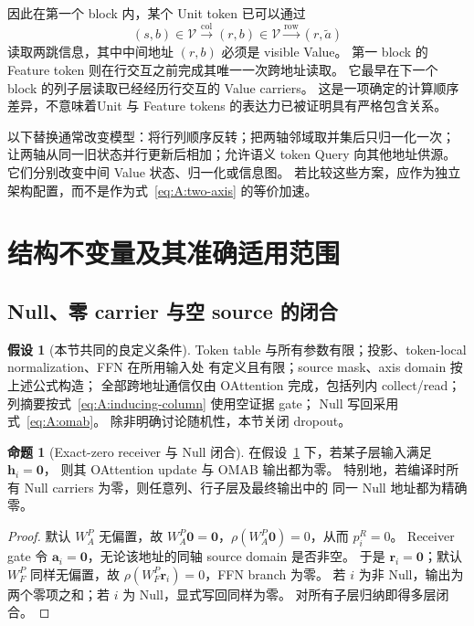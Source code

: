 \documentclass[11pt,UTF8,fontset=fandol]{ctexart}
\numberwithin{equation}{section}
\theoremstyle{definition}
\newtheorem{assumption}[definition]{假设}
\newtheorem{proposition}[definition]{命题}
\newcommand{\Vset}{\mathcal V}
\newcommand{\Ustar}{\widetilde a}
\begin{document}
因此在第一个 block 内，某个 Unit token 已可以通过
\begin{equation}
 (s,b)\in\Vset
 \xrightarrow{\mathrm{col}}
 (r,b)\in\Vset
 \xrightarrow{\mathrm{row}}
 (r,\Ustar)
 \label{eq:A:unit-two-hop}
\end{equation}
读取两跳信息，其中中间地址 $(r,b)$ 必须是 visible Value。
第一 block 的 Feature token 则在行交互之前完成其唯一一次跨地址读取。
它最早在下一个 block 的列子层读取已经经历行交互的 Value carriers。
这是一项确定的计算顺序差异，不意味着Unit 与 Feature tokens 的表达力已被证明具有严格包含关系。

以下替换通常改变模型：将行列顺序反转；把两轴邻域取并集后只归一化一次；
让两轴从同一旧状态并行更新后相加；允许语义 token Query 向其他地址供源。
它们分别改变中间 Value 状态、归一化或信息图。
若比较这些方案，应作为独立架构配置，而不是作为式~\eqref{eq:A:two-axis} 的等价加速。


\section{结构不变量及其准确适用范围}
\label{sec:A:invariants}

\subsection{Null、零 carrier 与空 source 的闭合}
\label{subsec:A:zero-closure}

\begin{assumption}[本节共同的良定义条件]
\label{ass:A:finite-local}
Token table 与所有参数有限；投影、token-local normalization、FFN 在所用输入处
有定义且有限；source mask、axis domain 按上述公式构造；
全部跨地址通信仅由 OAttention 完成，包括列内 collect/read；
列摘要按式~\eqref{eq:A:inducing-column} 使用空证据 gate；
Null 写回采用式~\eqref{eq:A:omab}。
除非明确讨论随机性，本节关闭 dropout。
\end{assumption}

\begin{proposition}[Exact-zero receiver 与 Null 闭合]
\label{prop:A:null-closure}
在假设~\ref{ass:A:finite-local} 下，若某子层输入满足 $\bm h_i=\bm0$，
则其 OAttention update 与 OMAB 输出都为零。
特别地，若编译时所有 Null carriers 为零，则任意列、行子层及最终输出中的
同一 Null 地址都为精确零。
\end{proposition}
\begin{proof}
默认 $W_A^{P}$ 无偏置，故 $W_A^{P}\bm0=\bm0$，$\rho(W_A^{P}\bm0)=0$，从而 $p_i^R=0$。
Receiver gate 令 $\bm a_i=\bm0$，无论该地址的同轴 source domain 是否非空。
于是 $\bm r_i=\bm0$；默认 $W_F^{P}$ 同样无偏置，故 $\rho(W_F^{P}\bm r_i)=0$，FFN branch 为零。
若 $i$ 为非 Null，输出为两个零项之和；若 $i$ 为 Null，显式写回同样为零。
对所有子层归纳即得多层闭合。
\end{proof}
\end{document}
